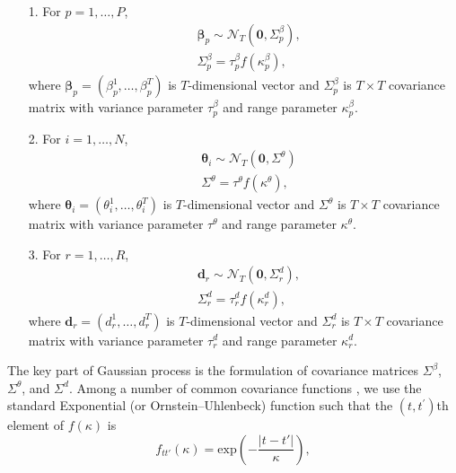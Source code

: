 \documentclass[a4paper]{article}
\begin{document}
\begin{center}
\begin{itemize}
	\item[1.] For $p = 1,\ldots,P$,
	\begin{equation*}
	\begin{aligned}
&	\boldsymbol{\beta}_{p}\sim \mathcal{N}_T(\boldsymbol{0}, \Sigma^\beta_p),\\
&\Sigma^\beta_p = \tau_p^\beta f(\kappa^\beta_{p}),
	\end{aligned}
	\end{equation*}
 where $\boldsymbol{\beta}_{p} = (\beta^1_p,\ldots, \beta^T_p)$ is $T$-dimensional vector and $\Sigma^\beta_p$ is $T \times T$ covariance matrix with variance parameter $\tau^{\beta}_p$ and range parameter $\kappa^\beta_{p}$. 
	\item[2.] For $i = 1,\ldots,N$, 
		\begin{equation*}
	\begin{aligned}
	&	\boldsymbol{\theta}_{i}\sim \mathcal{N}_T(\boldsymbol{0},\Sigma^\theta)\\
	&\Sigma^\theta = \tau^\theta f(\kappa^\theta),
	\end{aligned}
	\end{equation*}
	 where $\boldsymbol{\theta}_{i}= (\theta^1_i,\ldots, \theta^T_i)$ is $T$-dimensional vector and $\Sigma^\theta$ is $T\times T$ covariance matrix with variance parameter $\tau^{\theta}$ and range parameter $\kappa^\theta$. 
	\item[3.] For $r = 1,\ldots,R$, 
		\begin{equation*}
		\begin{aligned}
		&	\boldsymbol{d}_{r}\sim \mathcal{N}_T(\boldsymbol{0}, \Sigma^d_r),\\
		&\Sigma^d_r = \tau_r^d f(\kappa^d_{r}),
		\end{aligned}
		\end{equation*}
		where $\boldsymbol{d}_{r} = (d^1_r,\ldots,d^T_r)$ is $T$-dimensional vector and $\Sigma^d_r$ is $T\times T$ covariance matrix with variance parameter $\tau^{d}_r$ and range parameter $\kappa^d_{r}$. 
\end{itemize}
\end{center}
The key part of Gaussian process is the formulation of covariance matrices $\Sigma^\beta$, $\Sigma^\theta$, and $\Sigma^d$. Among a number of common covariance functions \citep{rasmussen2004gaussian}, we use the standard Exponential (or Ornstein--Uhlenbeck) function such that the $(t, t^\prime)$th element of $f(\kappa)$ is
\begin{equation*}
f_{tt'}(\kappa) = \mbox{exp}\left(-\frac{|t-t'|}{\kappa}\right),
\end{equation*}
\end{document}
